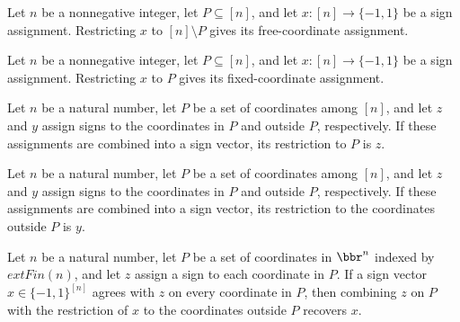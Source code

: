 \begin{definition}
\label{FABL.juntaFreePart}
\leanok
{}
Let $n$ be a nonnegative integer, let $P\subseteq[n]$, and let $x:[n]\to\{-1,1\}$ be a
sign assignment. Restricting $x$ to $[n]\setminus P$ gives its free-coordinate
assignment.
\end{definition}

\begin{definition}
\label{FABL.juntaFixedPart}
\leanok
{}
Let $n$ be a nonnegative integer, let $P\subseteq[n]$, and let $x:[n]\to\{-1,1\}$ be a
sign assignment. Restricting $x$ to $P$ gives its fixed-coordinate assignment.
\end{definition}

\begin{theorem}
\label{FABL.juntaFixedPart_combineJuntaAssignment}
\leanok
{}
Let $n$ be a natural number, let $P$ be a set of coordinates among $[n]$, and let $z$
and $y$ assign signs to the coordinates in $P$ and outside $P$, respectively. If these
assignments are combined into a sign vector, its restriction to $P$ is $z$.
\end{theorem}

\begin{theorem}
\label{FABL.juntaFreePart_combineJuntaAssignment}
\leanok
{}
Let $n$ be a natural number, let $P$ be a set of coordinates among $[n]$, and let $z$
and $y$ assign signs to the coordinates in $P$ and outside $P$, respectively. If these
assignments are combined into a sign vector, its restriction to the coordinates outside
$P$ is $y$.
\end{theorem}

\begin{theorem}
\label{FABL.combineJuntaAssignment_freePart_of_matches}
\leanok
{}
Let $n$ be a natural number, let $P$ be a set of coordinates in $\bbr^n$ indexed by
$	ext{Fin}(n)$, and let $z$ assign a sign to each coordinate in $P$. If a sign vector
$x\in\{-1,1\}^{[n]}$ agrees with $z$ on every coordinate in $P$, then combining $z$ on
$P$ with the restriction of $x$ to the coordinates outside $P$ recovers $x$.
\end{theorem}

